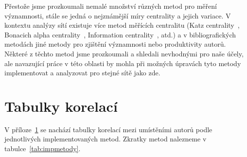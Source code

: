 \documentclass{bakalarka}
\begin{document}
Přestože jsme prozkoumali nemalé množství různých metod pro měření významnosti,
stále se jedná o nejznámější míry centrality a jejich variace. V kontextu
analýzy sítí existuje více metod měřících centralitu (Katz
centrality~\citep{katz1953}, Bonacich alpha
centrality~\citep{bonacichlloyd2001}, Information
centrality~\citep{stephensonzelen1989}, atd.) a v bibliografických metodách jiné
metody pro zjištění významnosti nebo produktivity autorů. Některé z těchto
metod jsme prozkoumali a shledali nevhodnými pro naše účely, ale navazující
práce v této oblasti by mohla při možných úpravách tyto metody implementovat a
analyzovat pro stejné sítě jako zde.




\appendix

\newpage
\chapter{Tabulky korelací}
\label{chapter:tabkor}

V příloze~\ref{chapter:tabkor} se nachází tabulky korelací mezi umístěními
autorů podle jednotlivých implementovaných metod. Zkratky metod nalezneme v
tabulce~\ref{tab:impmetody}.
\end{document}
